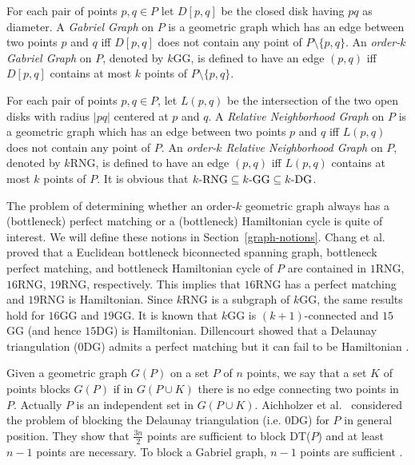 \documentclass[11pt,a4paper]{article}
\newcommand{\kDT}[2]{$#1$\text{-}DG#2}
\newcommand{\kGG}[2]{$#1$\text{-}GG#2}
\newcommand{\kRNG}[2]{$#1$\text{-}RNG#2}
\begin{document}
For each pair of points $p,q\in P$ let $D[p,q]$ be the closed disk having $pq$ as diameter. A {\em Gabriel Graph} on $P$ is a geometric graph which has an edge between two points $p$ and $q$ iff $D[p,q]$ does not contain any point of $P\setminus\{p,q\}$. An {\em order-$k$ Gabriel Graph} on $P$, denoted by \kGG{k}{}, is defined to have an edge $(p,q)$ iff $D[p,q]$ contains at most $k$ points of $P\setminus\{p,q\}$.

For each pair of points $p,q\in P$, let $L(p,q)$ be the intersection of the two open disks with radius $|pq|$ centered at $p$ and $q$. A {\em Relative Neighborhood Graph} on $P$ is a geometric graph which has an edge between two points $p$ and $q$ iff $L(p,q)$ does not contain any point of $P$. An {\em order-$k$ Relative Neighborhood Graph} on $P$, denoted by \kRNG{k}{}, is defined to have an edge $(p,q)$ iff $L(p,q)$ contains at most $k$ points of $P$. It is obvious that $\text{\kRNG{k}{}}\subseteq\text{\kGG{k}{}}\subseteq\text{\kDT{k}{}}$.

The problem of determining whether an order-$k$ geometric graph always has a (bottleneck) perfect matching or a (bottleneck) Hamiltonian cycle is quite of interest. We will define these notions in Section~\ref{graph-notions}. 
Chang et al. \cite{Chang1992b, Chang1992, Chang1991} proved that a Euclidean bottleneck biconnected spanning graph, bottleneck perfect matching, and bottleneck Hamiltonian cycle of $P$ are contained in \kRNG{1}{}, \kRNG{16}{}, \kRNG{19}{}, respectively. This implies that \kRNG{16}{} has a perfect matching and \kRNG{19}{} is Hamiltonian. Since \kRNG{k}{} is a subgraph of \kGG{k}{}, the same results hold for \kGG{16}{} and \kGG{19}{}. It is known that \kGG{k}{} is $(k+1)$-connected \cite{Bose2013} and 
\kGG{15}{} (and hence \kDT{15}{}) is Hamiltonian. Dillencourt showed that a Delaunay triangulation (\kDT{0}{}) admits a perfect matching \cite{Dillencourt1990} but it can fail to be Hamiltonian \cite{Dillencourt1987a}. 

Given a geometric graph $G(P)$ on a set $P$ of $n$ points, we say that a set $K$ of points blocks $G(P)$ if in $G(P\cup K)$ there is no edge connecting two points in $P$. Actually $P$ is an independent set in $G(P\cup K)$.
Aichholzer et al.~\cite{Aichholzer2013} considered the problem of blocking the Delaunay triangulation (i.e. \kDT{0}{}) for $P$ in general position. They show that $\frac{3n}{2}$ points are sufficient to block DT($P$) and at least $n-1$ points are necessary. To block a Gabriel graph, $n-1$ points are sufficient \cite{Aronov2013}.
\end{document}
